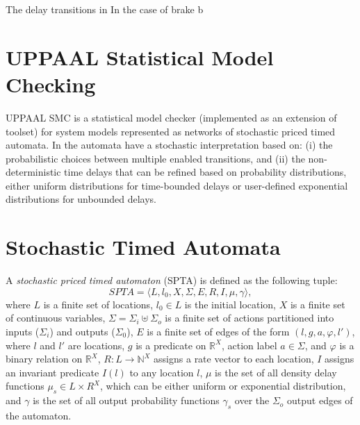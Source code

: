 The delay transitions in  In the case of brake b
\section{UPPAAL Statistical Model Checking}
UPPAAL SMC \cite{david2012statistical} is a statistical model checker (implemented as an extension of \uppaal{} toolset) for system models represented as networks of stochastic priced timed automata. In \uppaalsmc{} the automata have a stochastic interpretation based on: (i) the probabilistic choices between multiple enabled transitions, and (ii) the non-deterministic time delays that can be refined based on probability distributions, either uniform distributions for time-bounded delays or user-defined exponential distributions for unbounded delays.

\section*{Stochastic Timed Automata}
A \textit{stochastic priced timed automaton} (SPTA) is defined as the following tuple:
\begin{equation}
SPTA=\langle L, l_0, X, \Sigma, E, R, I, \mu, \gamma \rangle,
\label{eq:STA}
\end{equation}
where
$L$ is a finite set of locations,
$l_0 \in L$ is the initial location,
$X$ is a finite set of continuous variables,
$\Sigma =\Sigma_i \uplus \Sigma_o$ is a finite set of actions partitioned into inputs ($\Sigma_i$) and outputs ($\Sigma_0$),
$E$ is a finite set of edges of the form $(l,g,a,\varphi, l')$, where $l$ and $l'$ are locations, $g$ is a predicate on
$\mathbb{R}^X$, action label $a \in \Sigma$, and $\varphi$ is a binary relation on $\mathbb{R}^X$, $R : L \rightarrow \mathbb{N}^X$ assigns a rate vector to each location,
$I$ assigns an invariant predicate $I(l)$ to any location $l$, $\mu$ is the set of all density delay functions $\mu_s \in L \times R^X$, which can be either uniform or exponential distribution, and $\gamma$ is the set of all output probability functions $\gamma_s$ over the $\Sigma_o$ output edges of the automaton.

